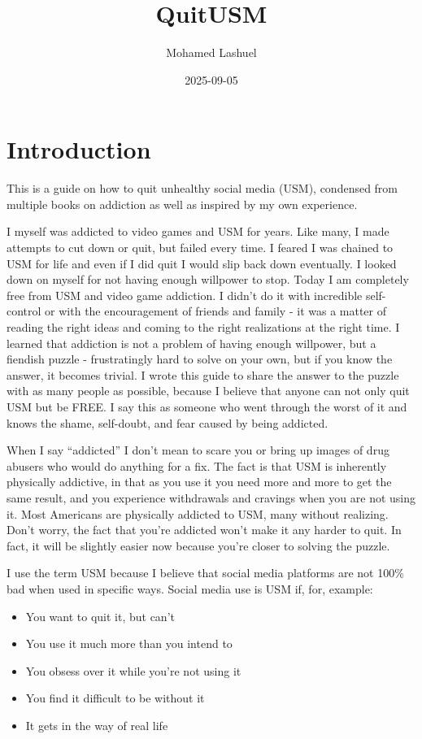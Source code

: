 \documentclass[
  openany]{book}
\title{QuitUSM}
\author{Mohamed Lashuel}
\date{2025-09-05}
\providecommand{\tightlist}{%
  \setlength{\itemsep}{0pt}\setlength{\parskip}{0pt}}
\begin{document}
\maketitle

{
\setcounter{tocdepth}{1}
\tableofcontents
}
\chapter{Introduction}\label{introduction}

This is a guide on how to quit unhealthy social media (USM), condensed from multiple books on addiction as well as inspired by my own experience.

I myself was addicted to video games and USM for years. Like many, I made attempts to cut down or quit, but failed every time. I feared I was chained to USM for life and even if I did quit I would slip back down eventually. I looked down on myself for not having enough willpower to stop. Today I am completely free from USM and video game addiction. I didn't do it with incredible self-control or with the encouragement of friends and family - it was a matter of reading the right ideas and coming to the right realizations at the right time. I learned that addiction is not a problem of having enough willpower, but a fiendish puzzle - frustratingly hard to solve on your own, but if you know the answer, it becomes trivial. I wrote this guide to share the answer to the puzzle with as many people as possible, because I believe that anyone can not only quit USM but be FREE. I say this as someone who went through the worst of it and knows the shame, self-doubt, and fear caused by being addicted.

When I say ``addicted'' I don't mean to scare you or bring up images of drug abusers who would do anything for a fix. The fact is that USM is inherently physically addictive, in that as you use it you need more and more to get the same result, and you experience withdrawals and cravings when you are not using it. Most Americans are physically addicted to USM, many without realizing. Don't worry, the fact that you're addicted won't make it any harder to quit. In fact, it will be slightly easier now because you're closer to solving the puzzle.

I use the term USM because I believe that social media platforms are not 100\% bad when used in specific ways. Social media use is USM if, for, example:

\begin{itemize}
\tightlist
\item
  You want to quit it, but can't
\item
  You use it much more than you intend to
\item
  You obsess over it while you're not using it
\item
  You find it difficult to be without it
\item
  It gets in the way of real life
\end{itemize}
\end{document}
